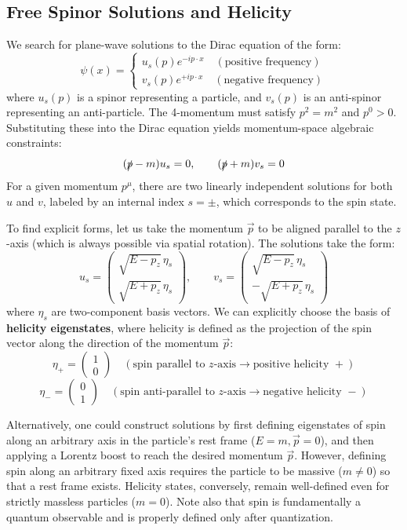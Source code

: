 \subsection{Free Spinor Solutions and Helicity}

We search for plane-wave solutions to the Dirac equation of the form:
\[
    \psi(x) = \begin{cases} u_s(p) e^{-ip \cdot x} \quad (\text{positive frequency}) \\ v_s(p) e^{+ip \cdot x} \quad (\text{negative frequency}) \end{cases}
\]
where $u_s(p)$ is a spinor representing a particle, and $v_s(p)$ is an anti-spinor representing an anti-particle. The 4-momentum must satisfy $p^2 = m^2$ and $p^0 > 0$. Substituting these into the Dirac equation yields momentum-space algebraic constraints:
\[
    (\slashed{p} - m)u_s = 0, \qquad (\slashed{p} + m)v_s = 0
\]
For a given momentum $p^\mu$, there are two linearly independent solutions for both $u$ and $v$, labeled by an internal index $s = \pm$, which corresponds to the spin state.

To find explicit forms, let us take the momentum $\vec{p}$ to be aligned parallel to the $z$-axis (which is always possible via spatial rotation). The solutions take the form:
\[
    u_s = \begin{pmatrix} \sqrt{E - p_z} \, \eta_s \\ \sqrt{E + p_z} \, \eta_s \end{pmatrix}, \qquad v_s = \begin{pmatrix} \sqrt{E - p_z} \, \eta_s \\ -\sqrt{E + p_z} \, \eta_s \end{pmatrix}
\]
where $\eta_s$ are two-component basis vectors. We can explicitly choose the basis of \textbf{helicity eigenstates}, where helicity is defined as the projection of the spin vector along the direction of the momentum $\vec{p}$:
\[
    \eta_+ = \begin{pmatrix} 1 \\ 0 \end{pmatrix} \quad (\text{spin parallel to } z\text{-axis} \to \text{positive helicity } +)
\]
\[
    \eta_- = \begin{pmatrix} 0 \\ 1 \end{pmatrix} \quad (\text{spin anti-parallel to } z\text{-axis} \to \text{negative helicity } -)
\]

\begin{remark}
    Alternatively, one could construct solutions by first defining eigenstates of spin along an arbitrary axis in the particle's rest frame ($E=m, \vec{p}=0$), and then applying a Lorentz boost to reach the desired momentum $\vec{p}$. However, defining spin along an arbitrary fixed axis requires the particle to be massive ($m \neq 0$) so that a rest frame exists. Helicity states, conversely, remain well-defined even for strictly massless particles ($m = 0$). Note also that spin is fundamentally a quantum observable and is properly defined only after quantization.
\end{remark}


